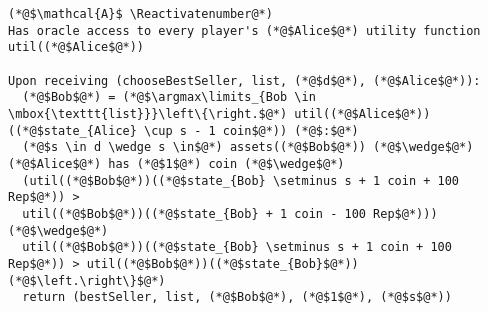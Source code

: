 \Suppressnumber
\begin{lstlisting}[label=distadv, style=numbers]
(*@$\mathcal{A}$ \Reactivatenumber@*)
Has oracle access to every player's (*@$Alice$@*) utility function util((*@$Alice$@*))

Upon receiving (chooseBestSeller, list, (*@$d$@*), (*@$Alice$@*)):
  (*@$Bob$@*) = (*@$\argmax\limits_{Bob \in \mbox{\texttt{list}}}\left\{\right.$@*) util((*@$Alice$@*))((*@$state_{Alice} \cup s - 1 coin$@*)) (*@$:$@*)
  (*@$s \in d \wedge s \in$@*) assets((*@$Bob$@*)) (*@$\wedge$@*) (*@$Alice$@*) has (*@$1$@*) coin (*@$\wedge$@*)
  (util((*@$Bob$@*))((*@$state_{Bob} \setminus s + 1 coin + 100 Rep$@*)) >
  util((*@$Bob$@*))((*@$state_{Bob} + 1 coin - 100 Rep$@*))) (*@$\wedge$@*)
  util((*@$Bob$@*))((*@$state_{Bob} \setminus s + 1 coin + 100 Rep$@*)) > util((*@$Bob$@*))((*@$state_{Bob}$@*)) (*@$\left.\right\}$@*)
  return (bestSeller, list, (*@$Bob$@*), (*@$1$@*), (*@$s$@*))
\end{lstlisting}
